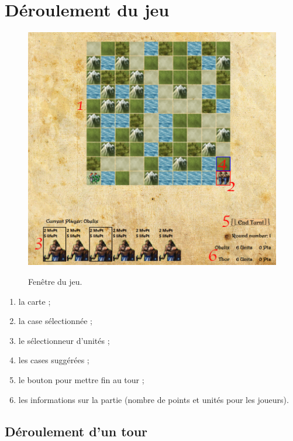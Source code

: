 \documentclass[a4paper,12pt]{article}
\begin{document}
\section{Déroulement du jeu}
\begin{figure}[H]
   \includegraphics[width=\textwidth]{game.png}
   \label{fig:create}
   \caption{Fenêtre du jeu.}
\end{figure}
\FloatBarrier

\begin{enumerate}
\item la carte ;
\item la case sélectionnée ;
\item le sélectionneur d'unités ;
\item les cases suggérées ;
\item le bouton pour mettre fin au tour ;
\item les informations sur la partie (nombre de points et unités pour les joueurs).
\end{enumerate}


\subsection{Déroulement d'un tour}
\end{document}

